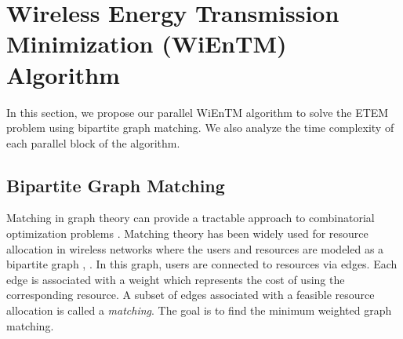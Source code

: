 \documentclass[12pt,draftclsnofoot,onecolumn]{IEEEtran}
\begin{document}
\section{Wireless Energy Transmission Minimization (WiEnTM) Algorithm}

In this section, we propose our parallel WiEnTM algorithm to solve the ETEM problem using bipartite graph matching. We also analyze the time complexity of each parallel block of the algorithm.

\subsection{Bipartite Graph Matching}
Matching in graph theory can provide a tractable approach to combinatorial optimization problems \cite{b17}. Matching theory has been widely used for resource allocation in wireless networks where the users and resources are modeled as a bipartite graph \cite{b16}, \cite{b17}. In this graph, users are connected to resources via edges. Each edge is associated with a weight which represents the cost of using the corresponding resource. A subset of edges associated with a feasible resource allocation is called a \textit{matching}. The goal is to find the minimum weighted graph matching.
\end{document}
